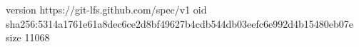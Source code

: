 version https://git-lfs.github.com/spec/v1
oid sha256:5314a1761e61a8dec6ce2d8bf49627b4cdb544db03eefc6e992d4b15480eb07e
size 11068
